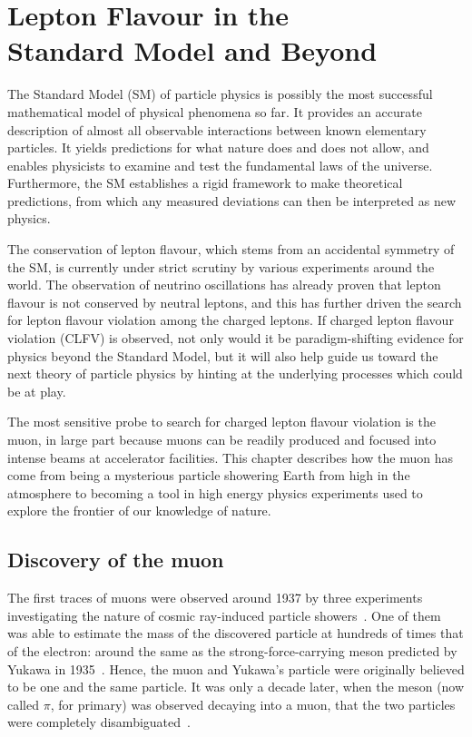\chapter[Lepton Flavour in the Standard Model and Beyond]{Lepton Flavour in
the\\Standard Model and Beyond}
\label{ch:theory}

The Standard Model (SM) of particle physics is possibly the most successful
mathematical model of physical phenomena so far. It provides an accurate
description of almost all observable interactions between known elementary
particles. It yields predictions for what nature does and does not allow, and
enables physicists to examine and test the fundamental laws of the universe.
Furthermore, the SM establishes a rigid framework to make theoretical
predictions, from which any measured deviations can then be interpreted as new
physics.

The conservation of lepton flavour, which stems from an accidental symmetry of
the SM, is currently under strict scrutiny by various experiments around the
world. The observation of neutrino oscillations has already proven that lepton
flavour is not conserved by neutral leptons, and this has further driven the
search for lepton flavour violation among the charged leptons. If charged lepton
flavour violation (CLFV) is observed, not only would it be paradigm-shifting
evidence for physics beyond the Standard Model, but it will also help guide us
toward the next theory of particle physics by hinting at the underlying
processes which could be at play.

The most sensitive probe to search for charged lepton flavour violation is the
muon, in large part because muons can be readily produced and focused into
intense beams at accelerator facilities. This chapter describes how the muon has
come from being a mysterious particle showering Earth from high in the
atmosphere to becoming a tool in high energy physics experiments used to explore
the frontier of our knowledge of nature.


\section{Discovery of the muon}
The first traces of muons were observed around 1937 by three experiments
investigating the nature of cosmic ray-induced particle
showers~\cite{PhysRev.51.884, PhysRev.52.1198, PhysRev.52.1003}. One of them was
able to estimate the mass of the discovered particle at hundreds of times that of the
electron: around the same as the strong-force-carrying meson predicted by Yukawa
in 1935~\cite{10.1143/PTPS.1.1}. Hence, the muon and Yukawa's particle were
originally believed to be one and the same particle. It was only a decade later,
when the meson (now called $\pi$, for primary) was observed decaying into a
muon, that the two particles were completely disambiguated~\cite{LATTES1947}.

